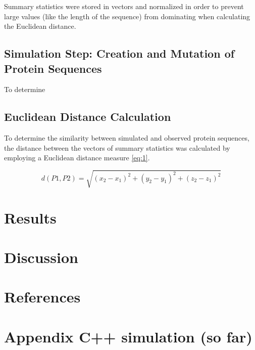 \documentclass{article}
\begin{document}
Summary statistics were stored in vectors and normalized in order to prevent large values (like the length of the sequence) from dominating when calculating the Euclidean distance.

\subsection{Simulation Step: Creation and Mutation of Protein Sequences}

To determine

\subsection{Euclidean Distance Calculation}

To determine the similarity between simulated and observed protein sequences, the distance between the vectors of summary statistics was calculated by employing a Euclidean distance measure \eqref{eq:1}.

\begin{equation}
	d(P1,P2) = \sqrt{(x_2-x_1)^2 + (y_2-y_1)^2 + (z_2-z_1)^2 }
	\label{eq:1}
\end{equation}


\section{Results}





\section{Discussion}

\clearpage\newpage
\section{References}


\nocite{*}
\printbibliography[heading=none, sorting=nyt]
\newpage

\section{Appendix C++ simulation (so far)}

\end{document}
